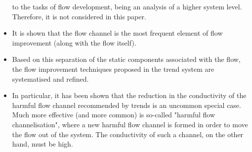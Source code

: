 \documentclass[a4paper,11pt]{article}
\begin{document}
\begin{itemize}
  to the tasks of flow development, being an analysis of a higher system
  level. Therefore, it is not considered in this paper.
\item It is shown that the flow channel is the most frequent element of flow
  improvement (along with the flow itself).
\item Based on this separation of the static components associated with the
  flow, the flow improvement techniques proposed in the trend system are
  systematised and refined.
\item In particular, it has been shown that the reduction in the conductivity
  of the harmful flow channel recommended by trends is an uncommon special
  case. Much more effective (and more common) is so-called "harmful flow
  channelisation", where a new harmful flow channel is formed in order to move
  the flow out of the system. The conductivity of such a channel, on the other
  hand, must be high.
\end{itemize}
\end{document}
